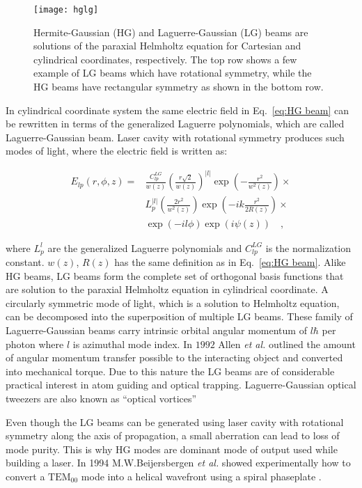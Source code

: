 \begin{figure}[t!]
  \centering
  \texttt{[image: hglg]}
  \caption{Hermite-Gaussian (HG) and Laguerre-Gaussian (LG) beams are solutions of the paraxial Helmholtz equation for Cartesian and cylindrical coordinates, respectively. The top row shows a few example of LG beams which have rotational symmetry, while the HG beams have rectangular symmetry as shown in the bottom row.}
  \label{fig:hglg}
\end{figure}


In cylindrical coordinate system the same electric field in Eq.~\eqref{eq:HG beam} can be rewritten in terms of the generalized Laguerre polynomials, which are called Laguerre-Gaussian beam. Laser cavity with rotational symmetry produces such modes of light, where the electric field is written as:

\begin{equation}
\label{eq: LG Beam}
\begin{split}
E_{lp}(r,\phi, z) = & \frac{C^{LG}_{lp}}{w(z)}\left(\frac{r\sqrt{2}}{w(z)}\right) ^{|l|}\exp \left(-\frac{r^2}{w^2 (z)}\right) \times \\
							& L^{|l|}_{p}\left(\frac{2r^2}{w^2(z)}\right) \exp \left( -ik\frac{r^2}{2R(z)}\right) \times \\
							& \exp (-il\phi) \exp (i\psi(z)) \quad ,
\end{split}
\end{equation}

where $L^{l}_{p}$ are the generalized Laguerre polynomials and $C^{LG}_{lp}$ is the normalization constant. $w(z)$, $R(z)$ has the same definition as in Eq.~\eqref{eq:HG beam}. Alike HG beams, LG beams form the complete set of orthogonal basis functions that are solution to the paraxial Helmholtz equation in cylindrical coordinate. A circularly symmetric mode of light, which is a solution to Helmholtz equation, can be decomposed into the superposition of multiple LG beams. These family of Laguerre-Gaussian beams carry intrinsic orbital angular momentum of $l\hbar$ per photon \cite{allen1992} where $l$ is azimuthal mode index. In $\mathrm{1992}$ Allen \emph{et al.} outlined the amount of angular momentum transfer possible to the interacting object and converted into mechanical torque. Due to this nature the LG beams are of considerable practical interest in atom guiding and optical trapping. Laguerre-Gaussian optical tweezers are also known as ``optical vortices'' 

Even though the LG beams can be generated using laser cavity with rotational symmetry along the axis of propagation, a small aberration can lead to loss of mode purity. This is why HG modes are dominant mode of output used while building a laser. In 1994 M.W.Beijersbergen \emph{et al.} \cite{BEIJERSBERGEN1994321} showed experimentally how to convert a $\mathrm{TEM}_{00}$ mode into a helical wavefront using a spiral phaseplate \cite{Ruffato:14}.


